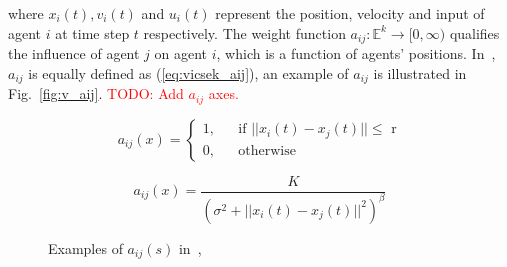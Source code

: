 \noindent
where $x_i(t), v_i(t)$ and $u_i(t)$ represent the position, velocity and input of agent $i$ at time step $t$ respectively. The weight function $a_{ij}:\mathbb{E}^k\to[0,\infty)$ qualifies the influence of agent $j$ on agent $i$, which is a function of agents' positions. In~\cite{Vicsek1995}, $a_{ij}$ is equally defined as (\ref{eq:vicsek_aij}), an example of $a_{ij}$ is illustrated in Fig.~\ref{fig:v_aij}. \textcolor{red}{TODO: Add $a_{ij}$ axes.}

\begin{equation}\label{eq:vicsek_aij}
a_{ij}(x)=\left\{\begin{array}{rcl}
1, & & \text{if $||x_i(t)-x_j(t)||\leq$ r}\\
0, & & \text{otherwise}
\end{array} \right.
\end{equation}

\begin{equation}\label{eq:cs_aij}
a_{ij}(x)=\frac{K}{(\sigma^2+||x_i(t)-x_j(t)||^2)^{\beta}}
\end{equation}

\begin{figure}[htb]
  \centering
  \caption{Examples of $a_{ij}(s)$ in~\cite{Vicsek1995},~\cite{CuckerSmale2007}}\label{fig:example_v}
\end{figure}

